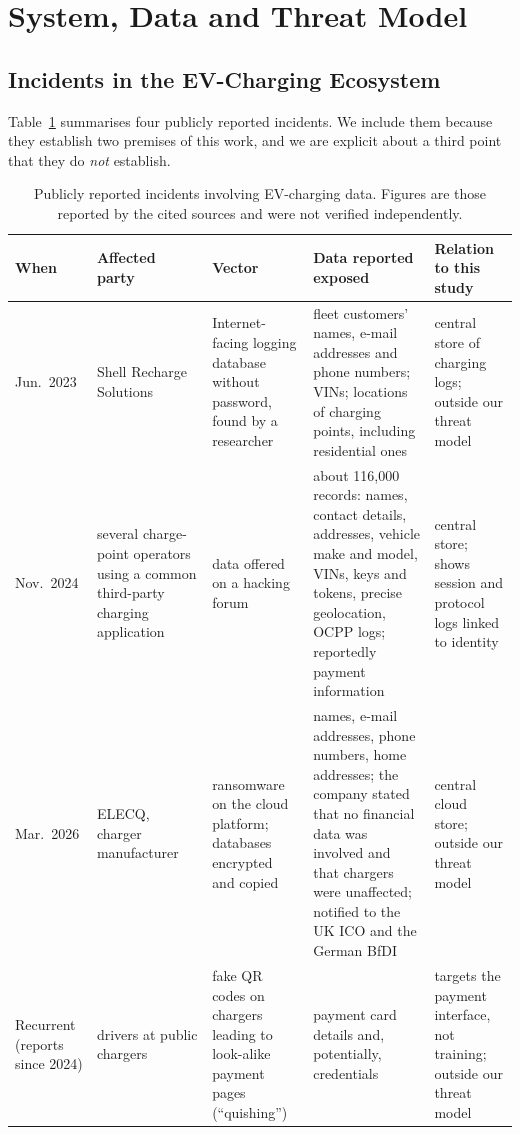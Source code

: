 
\section{System, Data and Threat Model}
\label{sec:system}

\subsection{Incidents in the EV-Charging Ecosystem}
\label{sec:threat-incidents}

Table~\ref{tab:incidents} summarises four publicly reported incidents. We
include them because they establish two premises of this work, and we are
explicit about a third point that they do \emph{not} establish.

\begin{table}[t]
\centering
\caption{Publicly reported incidents involving EV-charging data. Figures are
those reported by the cited sources and were not verified independently.}
\label{tab:incidents}
\footnotesize
\begin{tabular}{@{}p{1.3cm}p{2.6cm}p{3.0cm}p{5.2cm}p{4.0cm}@{}}
\toprule
When & Affected party & Vector & Data reported exposed & Relation to this study \\
\midrule
Jun.\ 2023 & Shell Recharge Solutions~\cite{whittaker2023shell} & Internet-facing logging database without password, found by a researcher & fleet customers' names, e-mail addresses and phone numbers; VINs; locations of charging points, including residential ones & central store of charging logs; outside our threat model \\
Nov.\ 2024 & several charge-point operators using a common third-party charging application~\cite{robb2024cpo} & data offered on a hacking forum & about 116{,}000 records: names, contact details, addresses, vehicle make and model, VINs, keys and tokens, precise geolocation, OCPP logs; reportedly payment information & central store; shows session and protocol logs linked to identity \\
Mar.\ 2026 & ELECQ, charger manufacturer~\cite{page2026elecq} & ransomware on the cloud platform; databases encrypted and copied & names, e-mail addresses, phone numbers, home addresses; the company stated that no financial data was involved and that chargers were unaffected; notified to the UK ICO and the German BfDI & central cloud store; outside our threat model \\
Recurrent (reports since 2024) & drivers at public chargers~\cite{muncaster2024quishing,rac2024qr} & fake QR codes on chargers leading to look-alike payment pages (``quishing'') & payment card details and, potentially, credentials & targets the payment interface, not training; outside our threat model \\
\bottomrule
\end{tabular}
\end{table}

